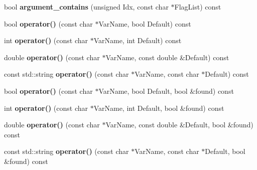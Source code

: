 \begin{DoxyCompactItemize}
\item 
\hypertarget{classGetPot_a30b6999f373de76e53eb702667b0b09f}{
bool {\bfseries argument\_\-contains} (unsigned Idx, const char $\ast$FlagList) const }
\label{classGetPot_a30b6999f373de76e53eb702667b0b09f}

\item 
\hypertarget{classGetPot_ae8ef969f90efc0b45d53265c45b4ae4d}{
bool {\bfseries operator()} (const char $\ast$VarName, bool Default) const }
\label{classGetPot_ae8ef969f90efc0b45d53265c45b4ae4d}

\item 
\hypertarget{classGetPot_a97a8b10f961e4401ef6f6db3b4642c78}{
int {\bfseries operator()} (const char $\ast$VarName, int Default) const }
\label{classGetPot_a97a8b10f961e4401ef6f6db3b4642c78}

\item 
\hypertarget{classGetPot_a9064c182ca259bead82b93d3083eb9ab}{
double {\bfseries operator()} (const char $\ast$VarName, const double \&Default) const }
\label{classGetPot_a9064c182ca259bead82b93d3083eb9ab}

\item 
\hypertarget{classGetPot_adc0c5a1666bce6eac40d24f444801d68}{
const std::string {\bfseries operator()} (const char $\ast$VarName, const char $\ast$Default) const }
\label{classGetPot_adc0c5a1666bce6eac40d24f444801d68}

\item 
\hypertarget{classGetPot_af87d43a0947c7464416434787821b59a}{
bool {\bfseries operator()} (const char $\ast$VarName, bool Default, bool \&found) const }
\label{classGetPot_af87d43a0947c7464416434787821b59a}

\item 
\hypertarget{classGetPot_a63be4fe6c4bb9fa1a08f1b36c9c60ffe}{
int {\bfseries operator()} (const char $\ast$VarName, int Default, bool \&found) const }
\label{classGetPot_a63be4fe6c4bb9fa1a08f1b36c9c60ffe}

\item 
\hypertarget{classGetPot_a526e6534609b0157a57959923f51fe93}{
double {\bfseries operator()} (const char $\ast$VarName, const double \&Default, bool \&found) const }
\label{classGetPot_a526e6534609b0157a57959923f51fe93}

\item 
\hypertarget{classGetPot_a7e54e5aa5777277a5bea8fdec05d6590}{
const std::string {\bfseries operator()} (const char $\ast$VarName, const char $\ast$Default, bool \&found) const }
\label{classGetPot_a7e54e5aa5777277a5bea8fdec05d6590}


\end{DoxyCompactItemize}
